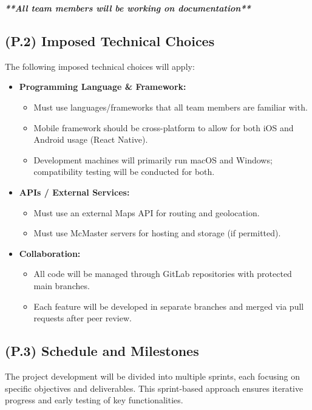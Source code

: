 \documentclass[12pt,letterpaper]{article}
\begin{document}
\textit{\textbf{**All team members will be working on documentation**}}


\subsection{(P.2) Imposed Technical Choices}
The following imposed technical choices will apply:
\begin{itemize}
  \item \textbf{Programming Language \& Framework:}
  \begin{itemize}
      \item Must use languages/frameworks that all team members are familiar with.
      \item Mobile framework should be cross-platform to allow for both iOS and Android usage (React Native).
      \item Development machines will primarily run macOS and Windows; compatibility testing will be conducted for both.
  \end{itemize}

  \item \textbf{APIs / External Services:}
  \begin{itemize}
      \item Must use an external Maps API for routing and geolocation.
      \item Must use McMaster servers for hosting and storage (if permitted).
  \end{itemize}

  \item \textbf{Collaboration:}
  \begin{itemize}
    \item All code will be managed through GitLab repositories with protected main branches.
    \item Each feature will be developed in separate branches and merged via pull requests after peer review.
  \end{itemize}
\end{itemize}

\subsection{(P.3) Schedule and Milestones}

The project development will be divided into multiple sprints, each focusing on specific objectives and deliverables. This sprint-based approach ensures iterative progress and early testing of key functionalities.
\end{document}
